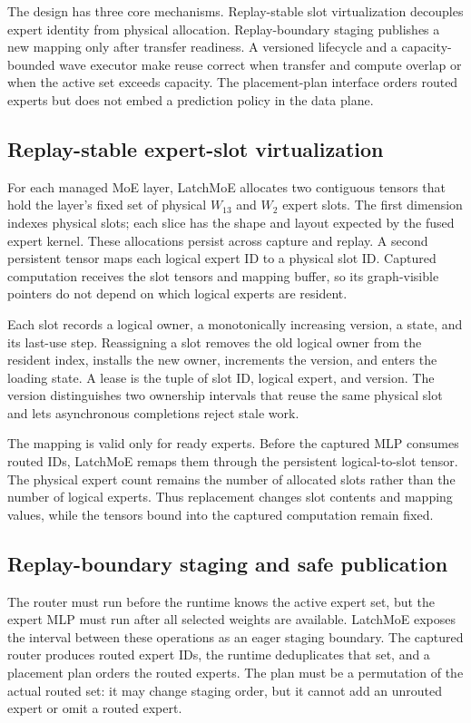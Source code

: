The design has three core mechanisms. Replay-stable slot virtualization
decouples expert identity from physical allocation. Replay-boundary staging
publishes a new mapping only after transfer readiness. A versioned lifecycle
and a capacity-bounded wave executor make reuse correct when transfer and
compute overlap or when the active set exceeds capacity. The placement-plan
interface orders routed experts but does not embed a prediction policy in the
data plane.

\subsection{Replay-stable expert-slot virtualization}
\label{sec:fixed-slots}

For each managed MoE layer, LatchMoE allocates two contiguous tensors that hold
the layer's fixed set of physical $W_{13}$ and $W_2$ expert slots. The first
dimension indexes physical slots; each slice has the shape and layout expected
by the fused expert kernel. These allocations persist across capture and
replay. A second persistent tensor maps each logical expert ID to a physical
slot ID. Captured computation receives the slot tensors and mapping buffer, so
its graph-visible pointers do not depend on which logical experts are resident.

Each slot records a logical owner, a monotonically increasing version, a state,
and its last-use step. Reassigning a slot removes the old logical owner from
the resident index, installs the new owner, increments the version, and enters
the loading state. A lease is the tuple of slot ID, logical expert, and version.
The version distinguishes two ownership intervals that reuse the same physical
slot and lets asynchronous completions reject stale work.

The mapping is valid only for ready experts. Before the captured MLP consumes
routed IDs, LatchMoE remaps them through the persistent logical-to-slot tensor.
The physical expert count remains the number of allocated slots rather than the
number of logical experts. Thus replacement changes slot contents and mapping
values, while the tensors bound into the captured computation remain fixed.

\subsection{Replay-boundary staging and safe publication}
\label{sec:staging}

The router must run before the runtime knows the active expert set, but the
expert MLP must run after all selected weights are available. LatchMoE exposes
the interval between these operations as an eager staging boundary. The
captured router produces routed expert IDs, the runtime deduplicates that set,
and a placement plan orders the routed experts. The plan must be a permutation
of the actual routed set: it may change staging order, but it cannot add an
unrouted expert or omit a routed expert.

